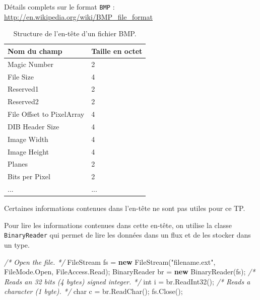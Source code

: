 \documentclass[11pt, a4paper]{article}
\newenvironment{Shaded}{}{}
\newcommand{\KeywordTok}[1]{\textcolor[rgb]{0.00,0.44,0.13}{\textbf{{#1}}}}
\newcommand{\DataTypeTok}[1]{\textcolor[rgb]{0.56,0.13,0.00}{{#1}}}
\newcommand{\StringTok}[1]{\textcolor[rgb]{0.25,0.44,0.63}{{#1}}}
\newcommand{\CommentTok}[1]{\textcolor[rgb]{0.38,0.63,0.69}{\textit{{#1}}}}
\newcommand{\FunctionTok}[1]{\textcolor[rgb]{0.02,0.16,0.49}{{#1}}}
\newcommand{\NormalTok}[1]{{#1}}
\begin{document}
Détails complets sur le format \texttt{BMP} :
\url{http://en.wikipedia.org/wiki/BMP_file_format}

\begin{table}[h]
\begin{center}
\begin{ttfamily}
\begin{tabular}{l||l}
Nom du champ & Taille en octet \\
\hline
Magic Number & 2 \\
File Size & 4 \\
Reserved1 & 2 \\
Reserved2 & 2 \\
File Offset to PixelArray & 4 \\
DIB Header Size & 4 \\
Image Width & 4 \\
Image Height & 4 \\
Planes & 2 \\
Bits per Pixel & 2 \\
... & ...
\end{tabular}
\end{ttfamily}
\end{center}
\caption{Structure de l'en-tête d'un fichier BMP.}
\end{table}

Certaines informations contenues dans l'en-tête ne sont pas utiles pour
ce TP.\newline

Pour lire les informations contenues dans cette en-tête, on utilise la
classe \texttt{BinaryReader} qui permet de lire les données dans un flux
et de les stocker dans un type.

\begin{Shaded}
\begin{Highlighting}[]
\CommentTok{/* Open the file. */}
\NormalTok{FileStream fs = }\KeywordTok{new} \FunctionTok{FileStream}\NormalTok{(}\StringTok{"filename.ext"}\NormalTok{, FileMode.}\FunctionTok{Open}\NormalTok{, FileAccess.}\FunctionTok{Read}\NormalTok{);}
\NormalTok{BinaryReader br = }\KeywordTok{new} \FunctionTok{BinaryReader}\NormalTok{(fs);}
\CommentTok{/* Reads an 32 bits (4 bytes) signed integer. */}
\DataTypeTok{int} \NormalTok{i = br.}\FunctionTok{ReadInt32}\NormalTok{();}
\CommentTok{/* Reads a character (1 byte). */}
\DataTypeTok{char} \NormalTok{c = br.}\FunctionTok{ReadChar}\NormalTok{();}
\NormalTok{fs.}\FunctionTok{Close}\NormalTok{();}
\end{Highlighting}
\end{Shaded}
\end{document}
